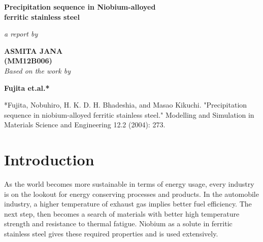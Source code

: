 \documentclass[12pt]{article}
\begin{document}
\begin{titlepage}
    \begin{center}
        \vspace*{5cm}
        
        {\LARGE \textbf{Precipitation sequence in Niobium-alloyed \\
	ferritic stainless steel}}
        
	\vspace{1.0cm}
	\textit{a report by}
        
        \vspace{1.5cm}
        
        \textbf{ASMITA JANA} \\
	\textbf{ (MM12B006)}\\
        
        \vspace{3.0cm}
        \textit{Based on the work by}\\

        
        \vspace{1.5cm}
        
        \textbf{Fujita et.al.*}\\
	 
	\vspace{5cm}

	\footnotesize{*Fujita, Nobuhiro, H. K. D. H. Bhadeshia, and Masao Kikuchi. "Precipitation sequence in niobium-alloyed ferritic stainless steel." Modelling and Simulation in Materials Science and Engineering 12.2 (2004): 273.}
    \end{center}
\end{titlepage}
\newpage

\section{Introduction}

   As the world becomes more sustainable in terms of energy usage, every industry is on the lookout for energy conserving processes and products. In the automobile industry, a higher temperature of exhaust gas implies better fuel efficiency. The next step, then becomes a search of materials with better high temperature strength and resistance to thermal fatigue. Niobium as a solute in ferritic stainless steel gives these required properties and is used extensively.
\end{document}
